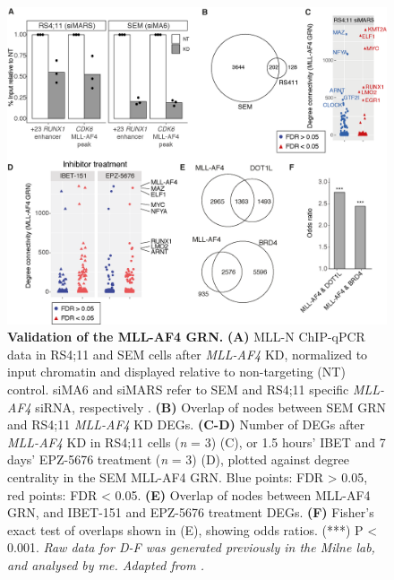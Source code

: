 \begin{figure}[!t]
    \centering
    \includegraphics[width=\textwidth,height=\textheight,keepaspectratio]{figures/chapter4/ch4_grn-rs411.png}
    \caption[{Validation of the MLL-AF4 GRN.}]
    {\textbf{Validation of the MLL-AF4 GRN.} 
    \textbf{(A)} MLL-N ChIP-qPCR data in RS4;11 and SEM cells after \textit{MLL-AF4} KD, normalized to input chromatin and displayed relative to non-targeting (NT) control. siMA6 and siMARS refer to SEM and RS4;11 specific \textit{MLL-AF4} siRNA, respectively \citep{thomas_targeting_2005}. 
    \textbf{(B)} Overlap of nodes between SEM GRN and RS4;11 \textit{MLL-AF4} KD DEGs. 
    \textbf{(C-D)} Number of DEGs after \textit{MLL-AF4} KD in RS4;11 cells (\textit{n} = 3) (C), or  1.5 hours’ IBET and 7 days’ EPZ-5676 treatment (\textit{n} = 3) (D), plotted against degree centrality in the SEM MLL-AF4 GRN. Blue points: FDR > 0.05, red points: FDR < 0.05. 
    \textbf{(E)} Overlap of nodes between MLL-AF4 GRN, and IBET-151 and EPZ-5676 treatment DEGs. 
    \textbf{(F)} Fisher's exact test of overlaps shown in (E), showing odds ratios. (***) P < 0.001. 
    \textit{Raw data for D-F was generated previously in the Milne lab, and analysed by me. Adapted from \cite{harman_kmt2a-aff1_2021}.} 
    }
    \label{fig:ch4_grn-rs411}
\end{figure}

